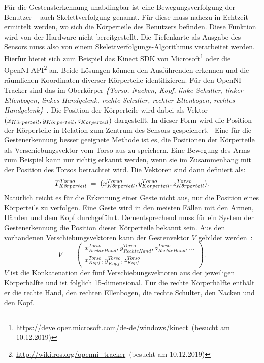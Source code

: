 Für die Gestensterkennung unabdingbar ist eine Bewegungsverfolgung der Benutzer -- auch Skelettverfolgung genannt. Für diese muss nahezu in Echtzeit ermittelt werden, wo sich die Körperteile des Benutzers befinden. Diese Funktion wird von der Hardware nicht bereitgestellt. Die Tiefenkarte als Ausgabe des Sensors muss also von einem Skelettverfolgungs-Algorithmus verarbeitet werden. Hierfür bietet sich zum Beispiel das Kinect SDK von Microsoft\footnote{\url{https://developer.microsoft.com/de-de/windows/kinect}~(besucht am 10.12.2019)} oder die OpenNI-API\footnote{\url{http://wiki.ros.org/openni_tracker}~(besucht am 10.12.2019)} an. Beide Lösungen können den Ausführenden erkennen und die räumlichen Koordinaten diverser Körperteile identifizieren. Für den OpenNI-Tracker sind das im Oberkörper \textit{\{Torso, Nacken, Kopf, linke Schulter, linker Ellenbogen, linkes Handgelenk, rechte Schulter, rechter Ellenbogen, rechtes Handgelenk\}}~\cite{openniManual}. Die Position der Körperteile wird dabei als Vektor $(x_{K\Ddot{o}rperteil}, y_{K\Ddot{o}rperteil}, z_{K\Ddot{o}rperteil})$ dargestellt. In dieser Form wird die Position der Körperteile in Relation zum Zentrum des Sensors gespeichert.~\cite{skeletonTracking} Eine für die Gestenerkennung besser geeignete Methode ist es, die Positionen der Körperteile als Verschiebungsvektor vom Torso aus zu speichern. Eine Bewegung des Arms zum Beispiel kann nur richtig erkannt werden, wenn sie im Zusammenhang mit der Position des Torsos betrachtet wird. Die Vektoren sind dann definiert als: 
\begin{equation}
    T_{K\Ddot{o}rperteil}^{Torso} \; = \; (x_{K\Ddot{o}rperteil}^{Torso}, y_{K\Ddot{o}rperteil}^{Torso}, z_{K\Ddot{o}rperteil}^{Torso}). 
\end{equation}
Natürlich reicht es für die Erkennung einer Geste nicht aus, nur die Position eines Körperteils zu verfolgen. Eine Geste wird in den meisten Fällen mit den Armen, Händen und dem Kopf durchgeführt. Dementsprechend muss für ein System der Gestenerkennung die Position dieser Körperteile bekannt sein. Aus den vorhandenen Verschiebungsvektoren kann der Gestenvektor $V$ gebildet werden~\cite{flexibleSystem}:
\begin{equation} \label{Gestenvektor}
    V \; = \; \begin{pmatrix}x_{Rechte Hand}^{Torso}, y_{Rechte Hand}^{Torso}, z_{Rechte Hand}^{Torso}, ...\\x_{Kopf}^{Torso}, y_{Kopf}^{Torso}, z_{Kopf}^{Torso}\end{pmatrix}. 
\end{equation}
$V$ ist die Konkatenation der fünf Verschiebungsvektoren aus der jeweiligen Körperhälfte und ist folglich 15-dimensional. Für die rechte Körperhälfte enthält er die rechte Hand, den rechten Ellenbogen, die rechte Schulter, den Nacken und den Kopf.~\cite{flexibleSystem}

